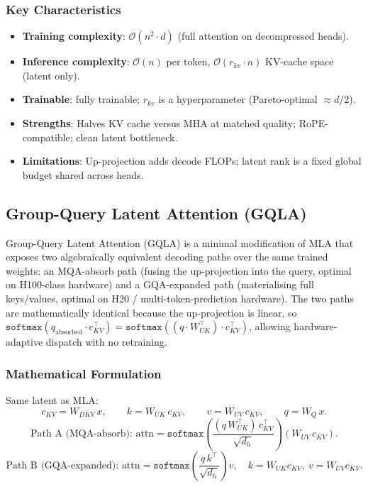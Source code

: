 \subsubsection{Key Characteristics}
\begin{itemize}[leftmargin=*]
    \item \textbf{Training complexity}: $\mathcal{O}(n^2 \cdot d)$ (full attention on decompressed heads).
    \item \textbf{Inference complexity}: $\mathcal{O}(n)$ per token, $\mathcal{O}(r_{kv} \cdot n)$ KV-cache space (latent only).
    \item \textbf{Trainable}: fully trainable; $r_{kv}$ is a hyperparameter (Pareto-optimal $\approx d/2$).
    \item \textbf{Strengths}: Halves KV cache versus MHA at matched quality; RoPE-compatible; clean latent bottleneck.
    \item \textbf{Limitations}: Up-projection adds decode FLOPs; latent rank is a fixed global budget shared across heads.
\end{itemize}

\subsection{Group-Query Latent Attention (GQLA)}
Group-Query Latent Attention (GQLA) \citep{meng_gqla_2026} is a minimal modification of MLA that exposes two algebraically equivalent decoding paths over the same trained weights: an MQA-absorb path (fusing the up-projection into the query, optimal on H100-class hardware) and a GQA-expanded path (materialising full keys/values, optimal on H20 / multi-token-prediction hardware). The two paths are mathematically identical because the up-projection is linear, so $\texttt{softmax}(q_{\text{absorbed}} \cdot c_{KV}^\top) = \texttt{softmax}((q \cdot W_{UK}^\top) \cdot c_{KV}^\top)$, allowing hardware-adaptive dispatch with no retraining.

\subsubsection{Mathematical Formulation}
Same latent as MLA:
\[
c_{KV} = W_{DKV}\, x, \qquad k = W_{UK}\, c_{KV}, \qquad v = W_{UV}\, c_{KV}, \qquad q = W_{Q}\, x.
\]
\[
\text{Path A (MQA-absorb): } \text{attn} = \texttt{softmax}\!\left(\frac{(q\, W_{UK}^\top)\, c_{KV}^\top}{\sqrt{d_h}}\right) (W_{UV}\, c_{KV}).
\]
\[
\text{Path B (GQA-expanded): } \text{attn} = \texttt{softmax}\!\left(\frac{q\, k^\top}{\sqrt{d_h}}\right) v, \quad k = W_{UK} c_{KV},\ v = W_{UV} c_{KV}.
\]

